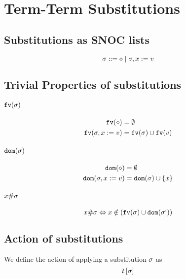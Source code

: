 {    \section{Term-Term Substitutions}



    \subsection{Substitutions as SNOC lists}

    \begin{equation}
       \sigma ::= \diamond \mid \sigma, x := v
    \end{equation}

    \subsection{Trivial Properties of substitutions}
    \paragraph{$\texttt{fv}(\sigma)$}
    \begin{align}
        \texttt{fv}(\diamond) &= \emptyset\\
        \texttt{fv}(\sigma, x:= v) &= \texttt{fv}(\sigma)\cup\texttt{fv}(v)
    \end{align}
    \paragraph{$\texttt{dom}(\sigma)$}
    \begin{align}
        \texttt{dom}(\diamond) & = \emptyset\\
        \texttt{dom}(\sigma, x:= v) & = \texttt{dom}(\sigma)\cup\left\{x\right\}
    \end{align}

    \paragraph{$x \# \sigma$}
    \begin{equation}
        x \# \sigma \Leftrightarrow x\notin(\texttt{fv}(\sigma)\cup\texttt{dom}(\sigma`))
    \end{equation}

    \subsection{Action of substitutions}
        We define the action of applying a substitution $\sigma$ as 
        $$t\left[\sigma\right]$$

}
